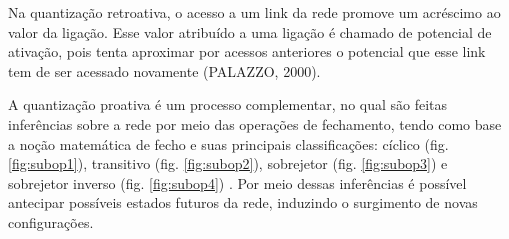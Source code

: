 Na quantização retroativa, o acesso a um link da rede promove um acréscimo ao valor da ligação. Esse valor atribuído a uma ligação é chamado de potencial de ativação, pois tenta aproximar por acessos anteriores o potencial que esse link tem de ser acessado novamente (PALAZZO, 2000).

A quantização proativa é um processo complementar, no qual são feitas inferências sobre a rede por meio das operações de fechamento, tendo como base a noção matemática de fecho e suas principais classificações: cíclico (fig. \ref{fig:subop1}), transitivo (fig. \ref{fig:subop2}), sobrejetor (fig. \ref{fig:subop3}) e sobrejetor inverso (fig. \ref{fig:subop4}) \cite{palazzo2000, fragelli2010}. Por meio dessas inferências é possível antecipar possíveis estados futuros da rede, induzindo o surgimento de novas configurações.


